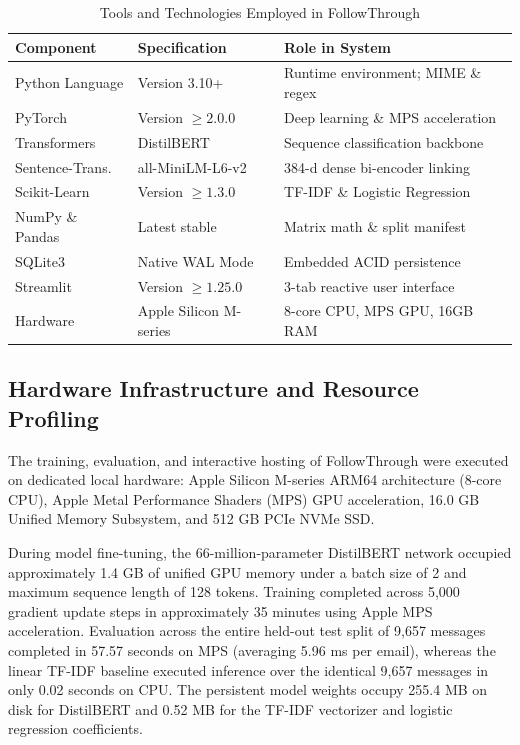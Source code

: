 \documentclass[conference]{IEEEtran}
\begin{document}
\begin{table}[htbp]
\caption{Tools and Technologies Employed in FollowThrough}
\begin{center}
\begin{tabular}{lll}
\toprule
\textbf{Component} & \textbf{Specification} & \textbf{Role in System} \\
\midrule
Python Language & Version 3.10+ & Runtime environment; MIME \& regex \\
PyTorch & Version $\ge 2.0.0$ & Deep learning \& MPS acceleration \\
Transformers & DistilBERT & Sequence classification backbone \\
Sentence-Trans. & all-MiniLM-L6-v2 & 384-d dense bi-encoder linking \\
Scikit-Learn & Version $\ge 1.3.0$ & TF-IDF \& Logistic Regression \\
NumPy \& Pandas & Latest stable & Matrix math \& split manifest \\
SQLite3 & Native WAL Mode & Embedded ACID persistence \\
Streamlit & Version $\ge 1.25.0$ & 3-tab reactive user interface \\
Hardware & Apple Silicon M-series & 8-core CPU, MPS GPU, 16GB RAM \\
\bottomrule
\end{tabular}
\label{tab:tools}
\end{center}
\end{table}

\subsection{Hardware Infrastructure and Resource Profiling}
The training, evaluation, and interactive hosting of FollowThrough were executed on dedicated local hardware: Apple Silicon M-series ARM64 architecture (8-core CPU), Apple Metal Performance Shaders (MPS) GPU acceleration, 16.0 GB Unified Memory Subsystem, and 512 GB PCIe NVMe SSD.

During model fine-tuning, the 66-million-parameter DistilBERT network occupied approximately 1.4 GB of unified GPU memory under a batch size of 2 and maximum sequence length of 128 tokens. Training completed across 5,000 gradient update steps in approximately 35 minutes using Apple MPS acceleration. Evaluation across the entire held-out test split of 9,657 messages completed in 57.57 seconds on MPS (averaging 5.96 ms per email), whereas the linear TF-IDF baseline executed inference over the identical 9,657 messages in only 0.02 seconds on CPU. The persistent model weights occupy 255.4 MB on disk for DistilBERT and 0.52 MB for the TF-IDF vectorizer and logistic regression coefficients.
\end{document}
